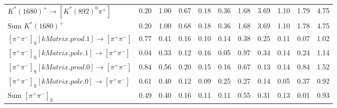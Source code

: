 \begin{tabular}{l  c  c  c  c  c  c  c  c  c  | c }
$K^{*}(1680)^{+}\rightarrow \left[K^{*}(892)^{0}\pi^{+}\right]$ & 0.20 & 1.00 & 0.67 & 0.18 & 0.36 & 1.68 & 3.69 & 1.10 & 1.79 & 4.75 \\ 
$\text{Sum } K^{*}(1680)^{+}$ & 0.20 & 1.00 & 0.68 & 0.18 & 0.36 & 1.68 & 3.69 & 1.10 & 1.78 & 4.75 \\ 
$\left[\pi^{+}\pi^{-}\right]_{\text{S}}\left[kMatrix.prod.1\right]\rightarrow \left[\pi^{+}\pi^{-}\right]$ & 0.77 & 0.41 & 0.16 & 0.10 & 0.14 & 0.38 & 0.25 & 0.11 & 0.07 & 1.02 \\ 
$\left[\pi^{+}\pi^{-}\right]_{\text{S}}\left[kMatrix.pole.1\right]\rightarrow \left[\pi^{+}\pi^{-}\right]$ & 0.04 & 0.33 & 0.12 & 0.16 & 0.05 & 0.97 & 0.34 & 0.14 & 0.24 & 1.14 \\ 
$\left[\pi^{+}\pi^{-}\right]_{\text{S}}\left[kMatrix.prod.0\right]\rightarrow \left[\pi^{+}\pi^{-}\right]$ & 0.84 & 0.56 & 0.20 & 0.15 & 0.16 & 0.67 & 0.13 & 0.14 & 0.84 & 1.52 \\ 
$\left[\pi^{+}\pi^{-}\right]_{\text{S}}\left[kMatrix.pole.0\right]\rightarrow \left[\pi^{+}\pi^{-}\right]$ & 0.61 & 0.40 & 0.12 & 0.09 & 0.25 & 0.27 & 0.14 & 0.05 & 0.37 & 0.92 \\ 
$\text{Sum } \left[\pi^{+}\pi^{-}\right]_{\text{S}}$ & 0.49 & 0.40 & 0.16 & 0.11 & 0.11 & 0.55 & 0.31 & 0.13 & 0.01 & 0.93 \\ 
\hline
\hline
\end{tabular}

